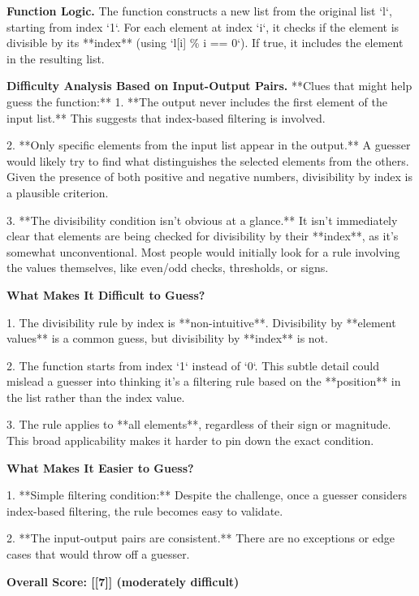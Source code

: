{\begin{minipage}{0.95\linewidth}
\textbf{Function Logic.}  
The function constructs a new list from the original list `l`, starting from index `1`. For each element at index `i`, it checks if the element is divisible by its **index** (using `l[i] \% i == 0`). If true, it includes the element in the resulting list.

\textbf{Difficulty Analysis Based on Input-Output Pairs.}  
**Clues that might help guess the function:**
1. **The output never includes the first element of the input list.**  
   This suggests that index-based filtering is involved.




   
2. **Only specific elements from the input list appear in the output.**  
   A guesser would likely try to find what distinguishes the selected elements from the others. Given the presence of both positive and negative numbers, divisibility by index is a plausible criterion.

3. **The divisibility condition isn't obvious at a glance.**  
   It isn't immediately clear that elements are being checked for divisibility by their **index**, as it's somewhat unconventional. Most people would initially look for a rule involving the values themselves, like even/odd checks, thresholds, or signs.
   
\textbf{What Makes It Difficult to Guess?}

1. The divisibility rule by index is **non-intuitive**.  
   Divisibility by **element values** is a common guess, but divisibility by **index** is not.  
   
2. The function starts from index `1` instead of `0`.  
   This subtle detail could mislead a guesser into thinking it's a filtering rule based on the **position** in the list rather than the index value.

3. The rule applies to **all elements**, regardless of their sign or magnitude.  
   This broad applicability makes it harder to pin down the exact condition.

\textbf{What Makes It Easier to Guess?}

1. **Simple filtering condition:**  
   Despite the challenge, once a guesser considers index-based filtering, the rule becomes easy to validate.

2. **The input-output pairs are consistent.**  
   There are no exceptions or edge cases that would throw off a guesser.

\textbf{Overall Score: [[7]] (moderately difficult)}


        \end{minipage}
    }

